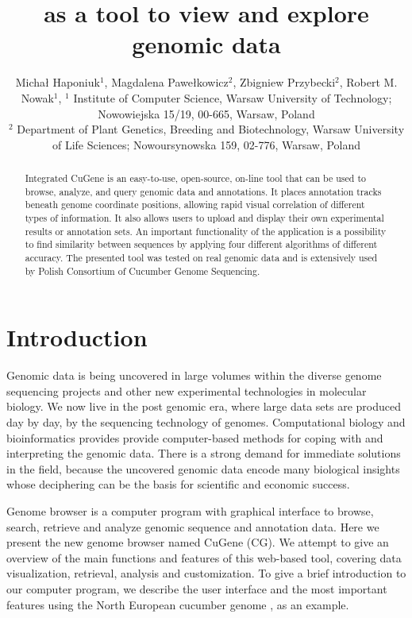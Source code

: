\documentclass[]{spie}
\title{\appName{} as a tool to view and explore genomic data}
\author{Michał Haponiuk$^{1}$, Magdalena Pawełkowicz$^{2}$, Zbigniew Przybecki$^{2}$, Robert M. Nowak$^{1}$,
  \skiplinehalf
  $^{1}$ Institute of Computer Science, Warsaw University of Technology; Nowowiejska 15/19, 00-665, Warsaw, Poland\\
  $^{2}$ Department of Plant Genetics, Breeding and Biotechnology, Warsaw University of Life Sciences; Nowoursynowska 159, 02-776, Warsaw, Poland\\
}
\newcommand{\appName}{CuGene}
\newcommand{\appShortcut}{CG}
\begin{document}
\maketitle

\begin{abstract}
  Integrated \appName{} is an easy-to-use, open-source, on-line tool that can be used to browse, analyze,
  and query genomic data and annotations.
  It places annotation tracks beneath genome coordinate positions, allowing rapid visual correlation of different types of information.
  It also allows users to upload and display their own experimental results or annotation sets.
  An important functionality of the application is a possibility to find similarity between sequences by applying four different algorithms of different accuracy.
  The presented tool was tested on real genomic data and is extensively used by Polish Consortium of Cucumber Genome Sequencing.
\end{abstract}


\section{Introduction}

Genomic data is being uncovered in large volumes within the diverse genome sequencing projects and other new experimental technologies in molecular biology.
We now live in the post genomic era, where large data sets are produced day by day, by the sequencing technology of genomes.
Computational biology and bioinformatics provides provide computer-based methods for coping with and interpreting the genomic data.
There is a strong demand for immediate solutions in the field,
because the uncovered genomic data encode many biological insights whose deciphering can be the basis for scientific and economic success.

Genome browser is a computer program with graphical interface to browse, search, retrieve and analyze genomic sequence and annotation data.
Here we present the new genome browser named \appName{} (\appShortcut).
We attempt to give an overview of the main functions and features of this web-based tool,
covering data visualization, retrieval, analysis and customization.
To give a brief introduction to our computer program, we describe the user interface and the most important features
using the North European cucumber genome \cite{woycicki2011genome}, as an example.
\end{document}
